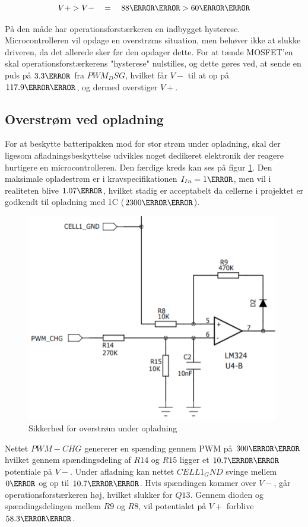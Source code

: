 \begin {equation} 
V+ > V- \quad = \quad 88\milli\volt > 60\milli\volt
\end {equation}

På den måde har operationsforstærkeren en indbygget hysterese.
Microcontrolleren vil opdage en overstrøms situation, men behøver ikke at slukke driveren, da det allerede sker før den opdager dette. For at tænde MOSFET'en skal operationsforstærkerens "hysterese" nulstilles, og dette gøres ved, at sende en puls på $3.3\volt$ fra $PWM_DSG$, hvilket får $V-$ til at op på $117.9\milli\volt$, og dermed overstiger $V+$.


\subsection{Overstrøm ved opladning}
For at beskytte batteripakken mod for stor strøm under opladning, skal der ligesom afladningsbeskyttelse udvikles noget dedikeret elektronik der reagere hurtigere en microcontrolleren. Den færdige kreds kan ses på figur \ref{fig:overcurrent_charge}. Den maksimale opladestrøm er i kravspecifikationen $I_{In}=1\ampere$, men vil i realiteten blive $1.07\ampere$, hvilket stadig er acceptabelt da cellerne i projektet er godkendt til opladning med 1C ($2300\milli\ampere$).
\\

\begin{figure}[h]
	\centering
	\includegraphics[width=11cm]{billeder/overcurrent_charge.png}
	\caption{Sikkerhed for overstrøm under opladning}
	\label{fig:overcurrent_charge}
\end{figure}

Nettet $PWM-CHG$ genererer en spænding gennem PWM på $300\milli\volt$ hvilket gennem spændingsdeling af $R14$ og $R15$ ligger et $10.7\milli\volt$ potentiale på $V-$. Under afladning kan nettet $CELL1_GND$ svinge mellem $0\volt$ og op til $10.7\milli\volt$. Hvis spændingen kommer over $V-$, går operationsforstærkeren høj, hvilket slukker for $Q13$. Gennem dioden og spændingsdelingen mellem $R9$ og $R8$, vil potentialet på $V+$ forblive $58.3\milli\volt$.
\\

